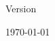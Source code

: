 \begin{titlepage}
\centering
{\Large \clioedition\par}
\vspace{1.5cm}
{\Huge \bfseries \cliotitle\par}
\vspace{0.5cm}
{\LARGE \cliosubtitle\par}
\vfill
{\Large Version \clioversion\par}
\vspace{0.5cm}
{\large \today\par}
\end{titlepage}
